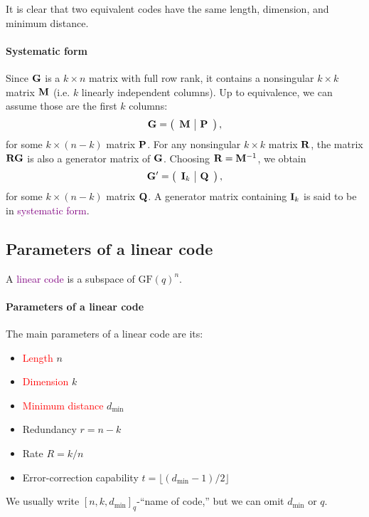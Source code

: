 \documentclass[a4paper, 11pt, openany]{book}
\numberwithin{equation}{section}
\theoremstyle{plain}
\theoremstyle{definition}
\newcommand{\GF}{\mathrm{GF}}
\newcommand{\dmin}{d_{\min}}
\newcommand{\Important}[1]{\textcolor{red}{#1}}
\newcommand{\Define}[1]{\textcolor{purple}{#1}}
\newcommand{\code}[1]{\mathsf{#1}}
\begin{document}

It is clear that two equivalent codes have the same length, dimension, and minimum distance.





\paragraph{Systematic form}
Since ${\bf G}$ is a $k \times n$ matrix with full row rank, it contains a nonsingular $k \times k$ matrix ${\bf M}$ (i.e. $k$ linearly independent columns). Up to equivalence, we can assume those are the first $k$ columns:
\[
	{\bf G} = \left( \begin{array}{c|c}
				{\bf M} & {\bf P}
	\end{array} \right),
\]
for some $k \times (n-k)$ matrix ${\bf P}$. For any nonsingular $k \times k$ matrix ${\bf R}$, the matrix ${\bf R}{\bf G}$ is also a generator matrix of ${\bf G}$. Choosing ${\bf R} = {\bf M}^{-1}$, we obtain
\[
	{\bf G}' = \left( \begin{array}{c|c}
					{\bf I}_k & {\bf Q}
		\end{array} \right),
\]
for some $k \times (n-k)$ matrix ${\bf Q}$. A generator matrix containing ${\bf I}_k$ is said to be in \Define{systematic form}.






\subsection{Parameters of a linear code}

A \Define{linear code} is a subspace of $\GF(q)^n$.



\paragraph{Parameters of a linear code}
The main parameters of a linear code are its:
\begin{itemize}
	\item \Important{Length} $n$
	\item \Important{Dimension} $k$
	\item \Important{Minimum distance} $\dmin$
	\item Redundancy $r = n-k$
	\item Rate $R = k/n$
	\item Error-correction capability $t = \lfloor (\dmin-1)/2 \rfloor$
\end{itemize}
We usually write $[n,k,\dmin]_q$-``name of code,'' but we can omit $\dmin$ or $q$.\\
~\\
\end{document}
